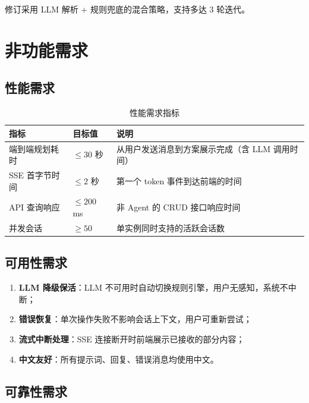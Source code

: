 \documentclass[12pt,a4paper]{ctexart}
\begin{document}
修订采用 LLM 解析 + 规则兜底的混合策略，支持多达 3 轮迭代。

\newpage

\section{非功能需求}

\subsection{性能需求}

\begin{table}[ht]
\centering
\begin{tabular}{p{3cm}p{3cm}p{7cm}}
\toprule
\textbf{指标} & \textbf{目标值} & \textbf{说明} \\
\midrule
端到端规划耗时 & $\leq 30$ 秒 & 从用户发送消息到方案展示完成（含 LLM 调用时间） \\
SSE 首字节时间 & $\leq 2$ 秒 & 第一个 token 事件到达前端的时间 \\
API 查询响应   & $\leq 200$ ms & 非 Agent 的 CRUD 接口响应时间 \\
并发会话       & $\geq 50$     & 单实例同时支持的活跃会话数 \\
\bottomrule
\end{tabular}
\caption{性能需求指标}
\label{tab:performance}
\end{table}

\subsection{可用性需求}

\begin{enumerate}[label=(\arabic*)]
  \item \textbf{LLM 降级保活}：LLM 不可用时自动切换规则引擎，用户无感知，系统不中断；
  \item \textbf{错误恢复}：单次操作失败不影响会话上下文，用户可重新尝试；
  \item \textbf{流式中断处理}：SSE 连接断开时前端展示已接收的部分内容；
  \item \textbf{中文友好}：所有提示词、回复、错误消息均使用中文。
\end{enumerate}

\subsection{可靠性需求}
\end{document}
